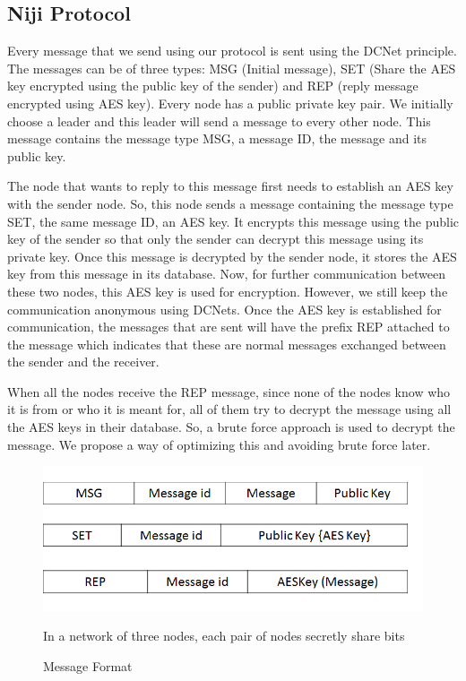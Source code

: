 \documentclass{acm_proc_article-sp}
\begin{document}
\subsection{Niji Protocol}
Every message that we send using our protocol is sent using the DCNet principle. The messages can be of three types: MSG (Initial message), SET (Share the AES key encrypted using the public key of the sender) and REP (reply message encrypted using AES key). Every node has a public private key pair. We initially choose a leader and this leader will send a message to every other node. This message contains the message type MSG, a message ID, the message and its public key. 

The node that wants to reply to this message first needs to establish an AES key with the sender node. So, this node sends a message containing the message type SET, the same message ID, an AES key. It encrypts this message using the public key of the sender so that only the sender can decrypt this message using its private key. Once this message is decrypted by the sender node, it stores the AES key from this message in its database. Now, for further communication between these two nodes, this AES key is used for encryption. However, we still keep the communication anonymous using DCNets. Once the AES key is established for communication, the messages that are sent will have the prefix REP attached to the message which indicates that these are normal messages exchanged between the sender and the receiver. 

When all the nodes receive the REP message, since none of the nodes know who it is from or who it is meant for, all of them try to decrypt the message using all the AES keys in their database. So, a brute force approach is used to decrypt the message. We propose a way of optimizing this and avoiding brute force later. 


\begin{figure}
\centering
\includegraphics[scale=.45]{MSGFormat2.png} \caption{Message Format}
\medskip
\small
In a network of three nodes, each pair of nodes secretly share bits
\label{fig:DCNet}
\end{figure}
\end{document}
